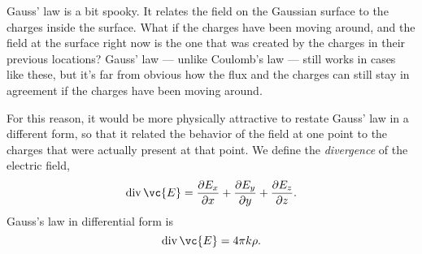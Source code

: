 Gauss' law is a bit spooky. It relates the field on the Gaussian surface
to the charges inside the surface. What if the charges have been moving
around, and the field at the surface right now is the one that was created
by the charges in their previous locations? Gauss' law --- unlike
Coulomb's law --- still works in cases like these, but it's far from
obvious how the flux and the charges can still stay in agreement if
the charges have been moving around.

For this reason, it would be more physically attractive to restate Gauss'
law in a different form, so that it related the behavior of the field
at one point to the charges that were actually present at that point.
We define the \emph{divergence} of the electric field,
\begin{equation*}
  \operatorname{div} \vc{E} = \frac{\partial E_x}{\partial x}+\frac{\partial E_y}{\partial y}
                                                +\frac{\partial E_z}{\partial z}.
\end{equation*}
Gauss's law in differential form is
\begin{equation*}
  \operatorname{div} \vc{E} = 4\pi k \rho.
\end{equation*}
